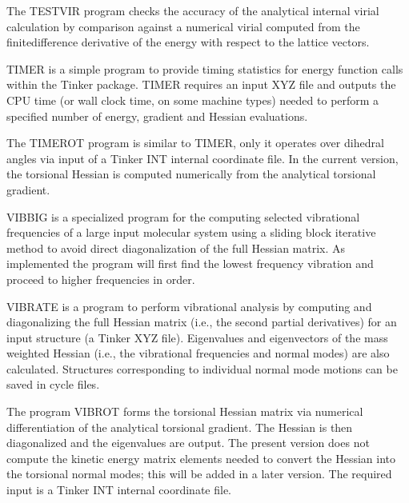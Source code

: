 \documentclass[letterpaper,11pt,english]{sphinxmanual}
\begin{document}

The TESTVIR program checks the accuracy of the analytical internal virial calculation by comparison against a numerical virial computed from the finite\sphinxhyphen{}difference derivative of the energy with respect to the lattice vectors.


TIMER is a simple program to provide timing statistics for energy function calls within the Tinker package. TIMER requires an input XYZ file and outputs the CPU time (or wall clock time, on some machine types) needed to perform a specified number of energy, gradient and Hessian evaluations.


The TIMEROT program is similar to TIMER, only it operates over dihedral angles via input of a Tinker INT internal coordinate file. In the current version, the torsional Hessian is computed numerically from the analytical torsional gradient.


VIBBIG is a specialized program for the computing selected vibrational frequencies of a large input molecular system using a sliding block iterative method to avoid direct diagonalization of the full Hessian matrix. As implemented the program will first find the lowest frequency vibration and proceed to higher frequencies in order.


VIBRATE is a program to perform vibrational analysis by computing and diagonalizing the full Hessian matrix (i.e., the second partial derivatives) for an input structure (a Tinker XYZ file). Eigenvalues and eigenvectors of the mass weighted Hessian (i.e., the vibrational frequencies and normal modes) are also calculated. Structures corresponding to individual normal mode motions can be saved in cycle files.


The program VIBROT forms the torsional Hessian matrix via numerical differentiation of the analytical torsional gradient. The Hessian is then diagonalized and the eigenvalues are output. The present version does not compute the kinetic energy matrix elements needed to convert the Hessian into the torsional normal modes; this will be added in a later version. The required input is a Tinker INT internal coordinate file.

\end{document}

